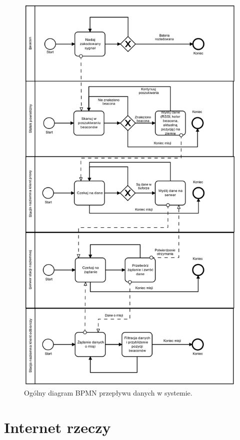 \begin{figure}[!th]
    \centering
    \includegraphics[width=12.8cm]{zalaczniki/obrazy/diagram_ogolny.png}
    \caption{Ogólny diagram BPMN przepływu danych w systemie.}
    \label{fig:diagramogolny}
\end{figure}

\section{Internet rzeczy}

